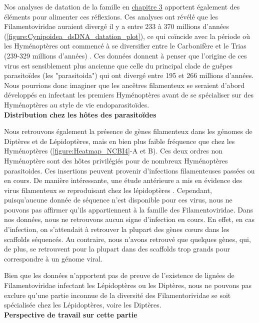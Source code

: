 Nos analyses de datation de la famille en \hyperref[sec:chap3]{chapitre 3} apportent également des éléments pour alimenter ces réflexions. Ces analyses ont révélé que les Filamentoviridae auraient divergé il y a entre 233 à 370 millions d'années (\figurename{\ref{figure:Cynipoidea_dsDNA_datation_plot}}), ce qui coïncide avec la période où les Hyménoptères ont commencé à se diversifier entre le Carbonifère et le Trias (239-329 millions d'années) \citep{peters_evolutionary_2017}. Ces données donnent à penser que l'origine de ces virus est sensiblement plus ancienne que celle du principal clade de guêpes parasitoïdes (les "parasitoida") qui ont divergé entre 195 et 266 millions d'années. Nous pourrions donc imaginer que les ancêtres filamenteux se seraient d'abord développés en infectant les premiers Hyménoptères avant de se spécialiser sur des Hyménoptères au style de vie endoparasitoïdes.\\

\textbf{Distribution chez les hôtes des parasitoïdes}

Nous retrouvons également la présence de gènes filamenteux dans les génomes de Diptères et de Lépidoptères, mais en bien plus faible fréquence que chez les Hyménoptères (\figurename{\ref{figure:Heatmap_NCBI4}}-A et B). Ces deux ordres non Hyménoptère sont des hôtes privilégiés pour de nombreux Hyménoptères parasitoides. Ces insertions peuvent provenir d'infections filamenteuses passées ou en cours. De manière intéressante, une étude antérieure a mis en évidence des virus filamenteux se reproduisant chez les lépidoptères \citep{styer_new_1987}. Cependant, puisqu'aucune donnée de séquence n'est disponible pour ces virus, nous ne pouvons pas affirmer qu'ils appartiennent à la famille des Filamentoviridae. Dans nos données, nous ne retrouvons aucun signe d'infection en cours. En effet, en cas d'infection, on s'attendait à retrouver la plupart des gènes cœurs dans les scaffolds séquencés. Au contraire, nous n'avons retrouvé que quelques gènes, qui, de plus, se retrouvent pour la plupart dans des scaffolds trop grands pour correspondre à un génome viral. 

Bien que les données n'apportent pas de preuve de l'existence de lignées de Filamentoviridae infectant les Lépidoptères ou les Diptères, nous ne pouvons pas exclure qu'une partie inconnue de la diversité des Filamentorividae se soit spécialisée chez les Lépidoptères, voire les Diptères.\\

\textbf{Perspective de travail sur cette partie}

